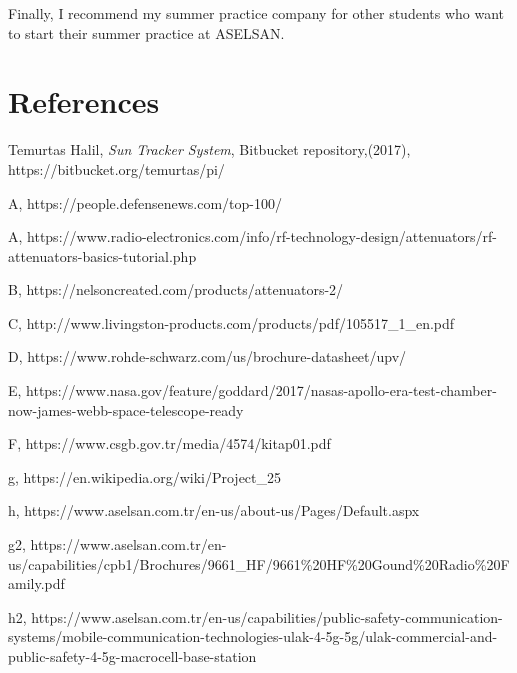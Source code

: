 	
	Finally, I recommend my summer practice company for other students who want to start their summer practice at ASELSAN. 

\-\vfill 


\section{References}

\begingroup
\renewcommand{\section}[2]{}%
\begin{thebibliography}{}

 Temurtas Halil,
	\textit{Sun Tracker System},
	Bitbucket repository,(2017),
	https://bitbucket.org/temurtas/pi/
	
	A,	
https://people.defensenews.com/top-100/	
	
	A,
	https://www.radio-electronics.com/info/rf-technology-design/attenuators/rf-attenuators-basics-tutorial.php

	B,
	https://nelsoncreated.com/products/attenuators-2/ 

	C,
	http://www.livingston-products.com/products/pdf/105517\_1\_en.pdf

	D,
	https://www.rohde-schwarz.com/us/brochure-datasheet/upv/

	E,
	https://www.nasa.gov/feature/goddard/2017/nasas-apollo-era-test-chamber-now-james-webb-space-telescope-ready

	F,
https://www.csgb.gov.tr/media/4574/kitap01.pdf

	g,
https://en.wikipedia.org/wiki/Project\_25

	h,
https://www.aselsan.com.tr/en-us/about-us/Pages/Default.aspx

	g2,
https://www.aselsan.com.tr/en-us/capabilities/cpb1/Brochures/9661\_HF/9661\%20HF\%20Gound\%20Radio\%20Family.pdf

	h2,
https://www.aselsan.com.tr/en-us/capabilities/public-safety-communication-systems/mobile-communication-technologies-ulak-4-5g-5g/ulak-commercial-and-public-safety-4-5g-macrocell-base-station

\end{thebibliography}

